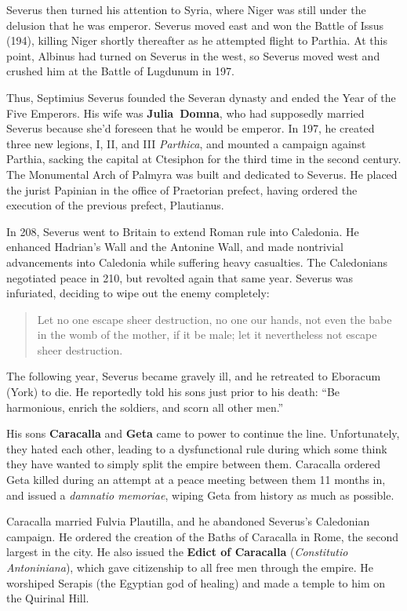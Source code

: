Severus then turned his attention to Syria,
where Niger was still under the delusion that he was emperor.
Severus moved east and won the Battle of Issus (194),
killing Niger shortly thereafter as he attempted flight to Parthia.
At this point, Albinus had turned on Severus in the west,
so Severus moved west and crushed him at the Battle of Lugdunum in 197.

Thus, Septimius Severus founded the Severan dynasty and ended the Year of the Five Emperors.
His wife was \textbf{Julia~Domna},
who had supposedly married Severus because she'd foreseen that he would be emperor.
In 197, he created three new legions, I, II, and III \textit{Parthica},
and mounted a campaign against Parthia,
sacking the capital at Ctesiphon for the third time in the second century.
The Monumental Arch of Palmyra was built and dedicated to Severus.
He placed the jurist Papinian in the office of Praetorian prefect,
having ordered the execution of the previous prefect, Plautianus.

In 208, Severus went to Britain to extend Roman rule into Caledonia.
He enhanced Hadrian's Wall and the Antonine Wall,
and made nontrivial advancements into Caledonia while suffering heavy casualties.
The Caledonians negotiated peace in 210, but revolted again that same year.
Severus was infuriated, deciding to wipe out the enemy completely:
\begin{quote}
  Let no one escape sheer destruction,
  no one our hands, not even the babe in the womb of the mother, if it be male;
  let it nevertheless not escape sheer destruction.
\end{quote}
The following year, Severus became gravely ill,
and he retreated to Eboracum (York) to die.
He reportedly told his sons just prior to his death:
``Be harmonious, enrich the soldiers, and scorn all other men.''

His sons \textbf{Caracalla} and \textbf{Geta} came to power to continue the line.
Unfortunately, they hated each other,
leading to a dysfunctional rule
during which some think they have wanted to simply split the empire between them.
Caracalla ordered Geta killed during an attempt at a peace meeting between them 11 months in,
and issued a \textit{damnatio memoriae}, wiping Geta from history as much as possible.

Caracalla married Fulvia Plautilla, and he abandoned Severus's Caledonian campaign.
He ordered the creation of the Baths of Caracalla in Rome,
the second largest in the city.
He also issued the \textbf{Edict of Caracalla} (\textit{Constitutio Antoniniana}),
which gave citizenship to all free men through the empire.
He worshiped Serapis (the Egyptian god of healing) and made a temple to him on the Quirinal Hill.

